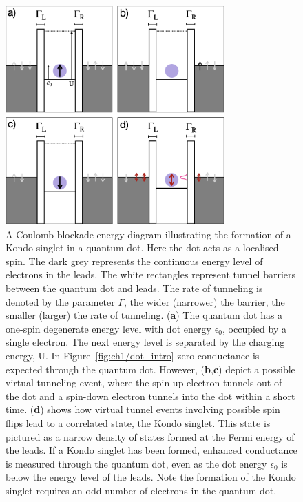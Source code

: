 \begin{figure}[!hbt]
 \begin{center}
  \includegraphics[width=0.75\textwidth]{figures/ch2/crop_FiguresMaster.010.png}
  \caption[Kondo effect in a quantum dot: Coulomb blockade energy diagrams]{\label{fig:ch2/kondo_dot_diagram} 
  A Coulomb blockade energy diagram illustrating the formation of a Kondo singlet in a quantum dot. Here the dot acts as a localised spin. The dark grey represents the continuous energy level of electrons in the leads. The white rectangles represent tunnel barriers between the quantum dot and leads. The rate of tunneling is denoted by the parameter $\Gamma$, the wider (narrower) the barrier, the smaller (larger) the rate of tunneling. (\textbf{a}) The quantum dot has a one-spin degenerate energy level with dot energy $\mathrm{\epsilon_0}$, occupied by a single electron. The next energy level is separated by the charging energy, $\mathrm{U}$. In Figure~\ref{fig:ch1/dot_intro} zero conductance is expected through the quantum dot. However, (\textbf{b},\textbf{c}) depict a possible virtual tunneling event, where the spin-up electron tunnels out of the dot and a spin-down electron tunnels into the dot within a short time. (\textbf{d}) shows how virtual tunnel events involving possible spin flips lead to a correlated state, the Kondo singlet. This state is pictured as a narrow density of states formed at the Fermi energy of the leads. If a Kondo singlet has been formed, enhanced conductance is measured through the quantum dot, even as the dot energy $\epsilon_0$ is below the energy level of the leads. Note the formation of the Kondo singlet requires an odd number of electrons in the quantum dot.
   }
 \end{center}
\end{figure}


